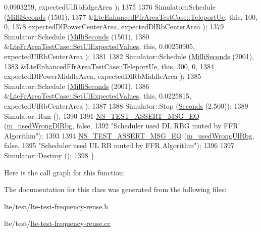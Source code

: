 \begin{DoxyCode}
       0.0903259, expectedUlRbEdgeArea );
1375 
1376   Simulator::Schedule (\hyperlink{group__timecivil_gaf26127cf4571146b83a92ee18679c7a9}{MilliSeconds} (1501),
1377                        &\hyperlink{classLteFrAreaTestCase_ad644210c338d4e34da3c5d7f0c511269}{LteEnhancedFfrAreaTestCase::TeleportUe}, \textcolor{keyword}{this},
       100, 0,
1378                        expectedDlPowerCenterArea, expectedDlRbCenterArea );
1379   Simulator::Schedule (\hyperlink{group__timecivil_gaf26127cf4571146b83a92ee18679c7a9}{MilliSeconds} (1501),
1380                        &\hyperlink{classLteFrAreaTestCase_aac2718dc3703d2ad389f88ffa20d035e}{LteFrAreaTestCase::SetUlExpectedValues}, \textcolor{keyword}{this},
       0.00250905, expectedUlRbCenterArea );
1381 
1382   Simulator::Schedule (\hyperlink{group__timecivil_gaf26127cf4571146b83a92ee18679c7a9}{MilliSeconds} (2001),
1383                        &\hyperlink{classLteFrAreaTestCase_ad644210c338d4e34da3c5d7f0c511269}{LteEnhancedFfrAreaTestCase::TeleportUe}, \textcolor{keyword}{this},
       300, 0,
1384                        expectedDlPowerMiddleArea, expectedDlRbMiddleArea );
1385   Simulator::Schedule (\hyperlink{group__timecivil_gaf26127cf4571146b83a92ee18679c7a9}{MilliSeconds} (2001),
1386                        &\hyperlink{classLteFrAreaTestCase_aac2718dc3703d2ad389f88ffa20d035e}{LteFrAreaTestCase::SetUlExpectedValues}, \textcolor{keyword}{this},
       0.0225815, expectedUlRbCenterArea );
1387 
1388   Simulator::Stop (\hyperlink{group__timecivil_ga33c34b816f8ff6628e33d5c8e9713b9e}{Seconds} (2.500));
1389   Simulator::Run ();
1390 
1391   \hyperlink{group__testing_ga2a9d78cffb3db8e867c35fff0b698cf5}{NS\_TEST\_ASSERT\_MSG\_EQ} (\hyperlink{classLteFrAreaTestCase_acf1b825c0fc50c57ac990d11ea1529c0}{m\_usedWrongDlRbg}, \textcolor{keyword}{false},
1392                          \textcolor{stringliteral}{"Scheduler used DL RBG muted by FFR Algorithm"});
1393 
1394   \hyperlink{group__testing_ga2a9d78cffb3db8e867c35fff0b698cf5}{NS\_TEST\_ASSERT\_MSG\_EQ} (\hyperlink{classLteFrAreaTestCase_a11e401119f17b78d6693ef29f82b8895}{m\_usedWrongUlRbg}, \textcolor{keyword}{false},
1395                          \textcolor{stringliteral}{"Scheduler used UL RB muted by FFR Algorithm"});
1396 
1397   Simulator::Destroy ();
1398 \}
\end{DoxyCode}


Here is the call graph for this function\+:




The documentation for this class was generated from the following files\+:\begin{DoxyCompactItemize}
\item 
lte/test/\hyperlink{lte-test-frequency-reuse_8h}{lte-\/test-\/frequency-\/reuse.\+h}\item 
lte/test/\hyperlink{lte-test-frequency-reuse_8cc}{lte-\/test-\/frequency-\/reuse.\+cc}\end{DoxyCompactItemize}
